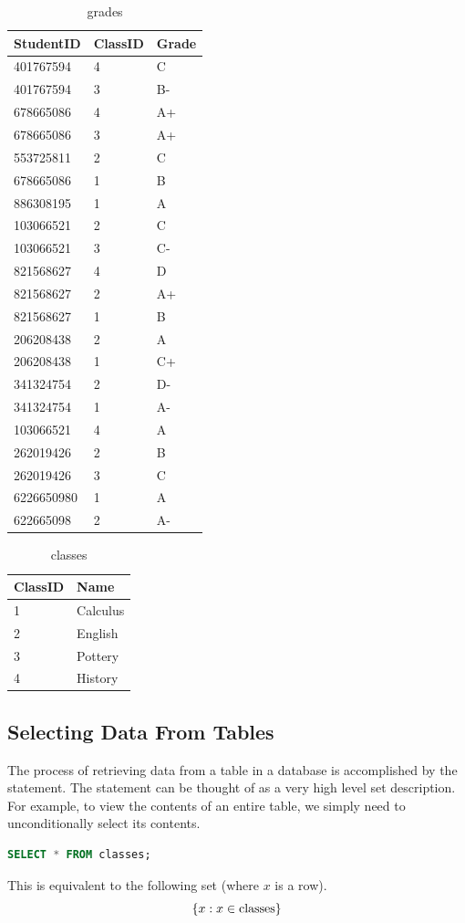 \begin{problem}
\begin{table}[H]
\begin{tabular}{|l|l|l|}
\hline
StudentID & ClassID & Grade \\
\hline
401767594 & 4 & C \\
401767594 & 3 & B- \\
678665086 & 4 & A+ \\
678665086 & 3 & A+ \\
553725811 & 2 & C \\
678665086 & 1 & B \\
886308195 & 1 & A \\
103066521 & 2 & C \\
103066521 & 3 & C- \\
821568627 & 4 & D \\
821568627 & 2 & A+ \\
821568627 & 1 & B \\
206208438 & 2 & A \\
206208438 & 1 & C+ \\
341324754 & 2 & D- \\
341324754 & 1 & A- \\
103066521 & 4 & A \\
262019426 & 2 & B \\
262019426 & 3 & C \\
6226650980 & 1 & A \\
622665098 & 2 & A- \\
\hline
\end{tabular}
\caption{grades}
\end{table}

\begin{table}[H]
\begin{tabular}{|l|l|}
\hline
ClassID & Name \\
\hline
1 & Calculus \\
2 & English \\
3 & Pottery \\
4 & History \\
\hline
\end{tabular}
\caption{classes}
\end{table}
\label{prob:sampletables}
\end{problem}


\subsection*{Selecting Data From Tables}
The process of retrieving data from a table in a database is accomplished by the  statement.
The  statement can be thought of as a very high level set description.
For example, to view the contents of an entire table, we simply need to unconditionally select its contents.
\begin{lstlisting}[language=SQL]
SELECT * FROM classes;
\end{lstlisting}
This is equivalent to the following set (where $x$ is a row).
\[ \lbrace x:x \in \text{classes}\rbrace \]

